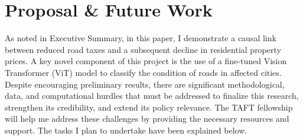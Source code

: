 \section*{Proposal \& Future Work}

As noted in Executive Summary, in this paper, I demonstrate a causal link between reduced road taxes and a subsequent decline in residential property prices. A key novel component of this project is the use of a fine-tuned Vision Transformer (ViT) model to classify the condition of roads in affected cities. Despite encouraging preliminary results, there are significant methodological, data, and computational hurdles that must be addressed to finalize this research, strengthen its credibility, and extend its policy relevance. The TAFT fellowship will help me address these challenges by providing the necessary resources and support. The tasks I plan to undertake have been explained below.

